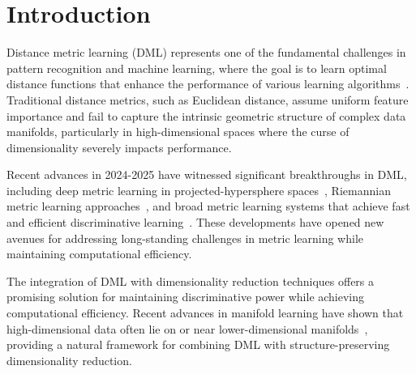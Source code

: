 \documentclass[review]{elsarticle}
\begin{document}
\linenumbers

\section{Introduction}
\label{sec:introduction}

Distance metric learning (DML) represents one of the fundamental challenges in pattern recognition and machine learning, where the goal is to learn optimal distance functions that enhance the performance of various learning algorithms~\cite{bellet2013survey}. Traditional distance metrics, such as Euclidean distance, assume uniform feature importance and fail to capture the intrinsic geometric structure of complex data manifolds, particularly in high-dimensional spaces where the curse of dimensionality severely impacts performance.

Recent advances in 2024-2025 have witnessed significant breakthroughs in DML, including deep metric learning in projected-hypersphere spaces~\cite{xu2025deep}, Riemannian metric learning approaches~\cite{gruffaz2025riemannian}, and broad metric learning systems that achieve fast and efficient discriminative learning~\cite{hu2025broad}. These developments have opened new avenues for addressing long-standing challenges in metric learning while maintaining computational efficiency.

The integration of DML with dimensionality reduction techniques offers a promising solution for maintaining discriminative power while achieving computational efficiency. Recent advances in manifold learning have shown that high-dimensional data often lie on or near lower-dimensional manifolds~\cite{roweis2000nonlinear,tenenbaum2000global}, providing a natural framework for combining DML with structure-preserving dimensionality reduction.
\end{document}
